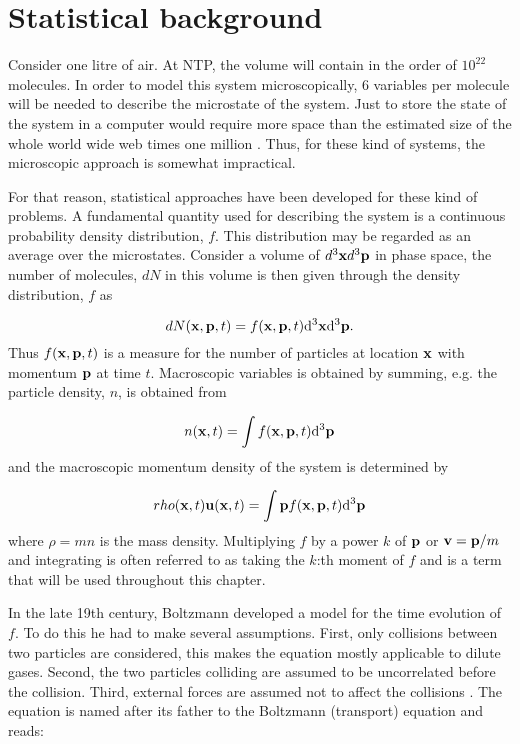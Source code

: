\section{Statistical background}\label{sec:lbm:stat}
Consider one litre of air. At NTP, the volume will contain in the
order of $10^{22}$ molecules. In order to model this system
microscopically, 6 variables per molecule will be needed to describe
the microstate of the system. Just to store the state of the system in
a computer would require more space than the estimated size of the
whole world wide web times one million \cite{wolfram-alpha-web}. Thus,
for these kind of systems, the microscopic approach is somewhat
impractical.

For that reason, statistical approaches have been developed for these
kind of problems. A fundamental quantity used for describing the
system is a continuous probability density distribution, $f$. This
distribution may be regarded as an average over the
microstates. Consider a volume of $d^3\mathbf{x} d^3\mathbf{p}$ in phase
space, the number of molecules, $dN$ in this volume is then given
through the density distribution, $f$ as

\begin{equation}
dN(\mathbf{x}, \mathbf{p}, t) = f(\mathbf{x}, \mathbf{p}, t)\mathrm{d}^3\mathbf{x} \mathrm{d}^3\mathbf{p}.
\end{equation}
Thus $f(\mathbf{x}, \mathbf{p}, t)$ is a measure for the number of particles at
location $\mathbf{x}$ with momentum $\mathbf{p}$ at time $t$. Macroscopic variables is
obtained by summing, e.g. the particle density, $n$, is obtained from

\begin{equation}
n(\mathbf{x}, t) = \int f(\mathbf{x}, \mathbf{p}, t) \mathrm{d}^3\mathbf{p}
\end{equation}
and the macroscopic momentum density of the system is determined by

\begin{equation}
rho(\mathbf{x}, t) \mathbf{u}(\mathbf{x}, t) = \int \mathbf{p} f(\mathbf{x}, \mathbf{p}, t) \mathrm{d}^3\mathbf{p}
\end{equation}
where $\rho = m n$ is the mass density. Multiplying $f$ by a power $k$ of
$\mathbf{p}$ or $\mathbf{v} = \mathbf{p}/m$ and integrating is often referred to as
taking the $k$:th moment of $f$ and is a term that will be used
throughout this chapter.

In the late 19th century, Boltzmann developed a model for the time
evolution of $f$. To do this he had to make several
assumptions. First, only collisions between two particles are
considered, this makes the equation mostly applicable to dilute
gases. Second, the two particles colliding are assumed to be
uncorrelated before the collision. Third, external forces are assumed
not to affect the collisions \cite{wolf-gladrow}. The equation is
named after its father to the Boltzmann (transport) equation and
reads:

